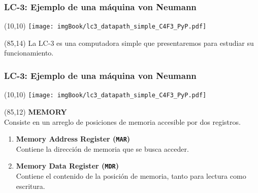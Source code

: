 \documentclass[aspectratio=169]{beamer}
\begin{document}
\begin{frame}[t,fragile]
    \frametitle{LC-3: Ejemplo de una máquina von Neumann}
    \begin{textblock}{70}(10,10)
    \texttt{[image: imgBook/lc3\_datapath\_simple\_C4F3\_PyP.pdf]}
    \end{textblock}
    \begin{textblock}{60}(85,14)
    \small
    La LC-3 es una computadora simple que presentaremos para estudiar su funcionamiento.\\
    \bigskip
    \bigskip
    \end{textblock}
\end{frame}

\begin{frame}[t,fragile]
    \frametitle{LC-3: Ejemplo de una máquina von Neumann}
    \begin{textblock}{70}(10,10)
    \texttt{[image: imgBook/lc3\_datapath\_simple\_C4F3\_PyP.pdf]}
    \end{textblock}
    \begin{textblock}{65}(85,12)
    \textbf{MEMORY}\\
    \small
    Consiste en un arreglo de posiciones de memoria accesible por dos registros.
    \bigskip
    \begin{enumerate}
    \item<2-> \textbf{Memory Address Register (\texttt{MAR})}\\ Contiene la dirección de memoria que se busca acceder.
    \item<3-> \textbf{Memory Data Register (\texttt{MDR})}\\ Contiene el contenido de la posición de memoria, tanto para lectura como escritura.
    \end{enumerate}
    \bigskip
    \end{textblock}
\end{frame}
\end{document}
